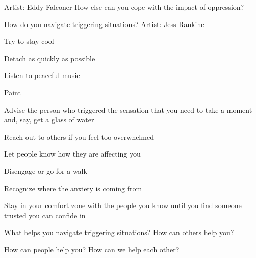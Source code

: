 \newpage

Artist: Eddy Falconer
How else can you cope with the impact of oppression?

\newpage

How do you navigate triggering situations?
Artist: Jess Rankine
\begin{checkboxlist}
\item Try to stay cool
\item Detach as quickly as possible
\item Listen to peaceful music
\item Paint
\item Advise the person who triggered the sensation that you need to take a moment and, say, get a glass of water
\item Reach out to others if you feel too overwhelmed
\item Let people know how they are affecting you
\item Disengage or go for a walk
\item Recognize where the anxiety is coming from
\item Stay in your comfort zone with the people you know until you find someone trusted you can confide in
\end{checkboxlist}

What helps you navigate triggering situations?
How can others help you?

\newpage

How can people help you?
How can we help each other?


